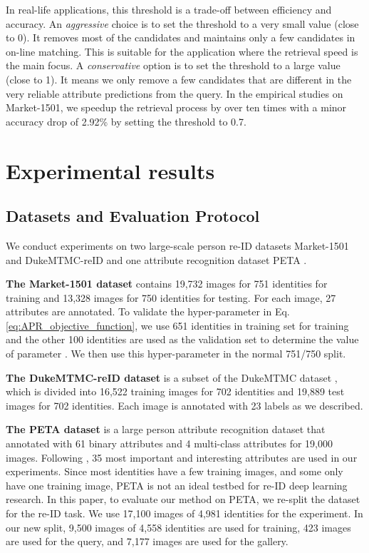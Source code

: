 \documentclass[5p,times,twocolumn]{elsarticle}
\begin{document}
In real-life applications, this threshold is a trade-off between efficiency and accuracy.
An \textit{aggressive} choice is to set the threshold to a very small value (close to 0). It removes most of the candidates and maintains only a few candidates in on-line matching. This is suitable for the application where the retrieval speed is the main focus. A \textit{conservative} option is to set the threshold to a large value (close to 1). It means we only remove a few candidates that are different in the very reliable attribute predictions from the query. In the empirical studies on Market-1501, we speedup the retrieval process by over ten times with a minor accuracy drop of 2.92\% by setting the threshold to 0.7.



\section{Experimental results}
\subsection{Datasets and Evaluation Protocol}
We conduct experiments on two large-scale person re-ID datasets Market-1501 \cite{Zheng_2015_ICCV} and DukeMTMC-reID \cite{Zheng_2017_ICCV} and one attribute recognition dataset PETA \cite{deng2014pedestrian}. 

\textbf{The Market-1501 dataset} contains 19,732 images for 751 identities for training and 13,328 images for 750 identities for testing. For each image, 27 attributes are annotated. To validate the hyper-parameter  in Eq.\eqref{eq:APR_objective_function}, we use 651 identities in training set for training and the other 100 identities are used as the validation set to determine the value of parameter . We then use this hyper-parameter in the normal 751/750 split. 
    
\textbf{The DukeMTMC-reID dataset} is a subset of the DukeMTMC dataset \cite{ristani2016performance}, which is divided into 16,522 training images for 702 identities and 19,889 test images for 702 identities. Each image is annotated with 23 labels as we described. 
    
\textbf{The PETA dataset} is a large person attribute recognition dataset that annotated with 61 binary attributes and 4 multi-class attributes for 19,000 images. Following  \cite{deng2014pedestrian}, 35 most important and interesting attributes are used in our experiments. 
Since most identities have a few training images, and some only have one training image, PETA is not an ideal testbed for re-ID deep learning research. In this paper, to evaluate our method on PETA, we re-split the dataset for the re-ID task. We use 17,100 images of 4,981 identities for the experiment. In our new split, 9,500 images of 4,558 identities are used for training, 423 images are used for the query, and 7,177 images are used for the gallery.
    
\end{document}
